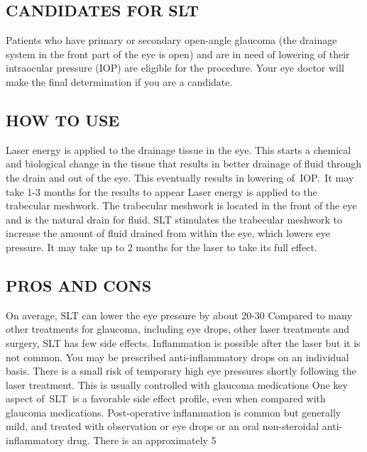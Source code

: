 \documentclass[12pt]{article}
\begin{document}
\subsection{CANDIDATES FOR SLT}
Patients who have primary or secondary open-angle glaucoma (the drainage system in the front part of the eye is open) and are in need of lowering of their intraocular pressure (IOP) are eligible for the procedure. Your eye doctor will make the final determination if you are a candidate.

\subsection{HOW TO USE}
Laser energy is applied to the drainage tissue in the eye. This starts a chemical and biological change in the tissue that results in better drainage of fluid through the drain and out of the eye. This eventually results in lowering of IOP. It may take 1-3 months for the results to appear
Laser energy is applied to the trabecular meshwork. The trabecular meshwork is located in the front of the eye and is the natural drain for fluid. SLT stimulates the trabecular meshwork to increase the amount of fluid drained from within the eye, which lowers eye pressure. It may take up to 2 months for the laser to take its full effect.


 
 \subsection{PROS AND CONS}
 On average, SLT can lower the eye pressure by about 20-30%
Compared to many other treatments for glaucoma, including eye drops, other laser treatments and surgery, SLT has few side effects. Inflammation is possible after the laser but it is not common. You may be prescribed anti-inflammatory drops on an individual basis. There is a small risk of temporary high eye pressures shortly following the laser treatment. This is usually controlled with glaucoma medications  One key aspect of SLT is a favorable side effect profile, even when compared with glaucoma medications. Post-operative inflammation is common but generally mild, and treated with observation or eye drops or an oral non-steroidal anti-inflammatory drug. There is an approximately 5%
\end{document}
